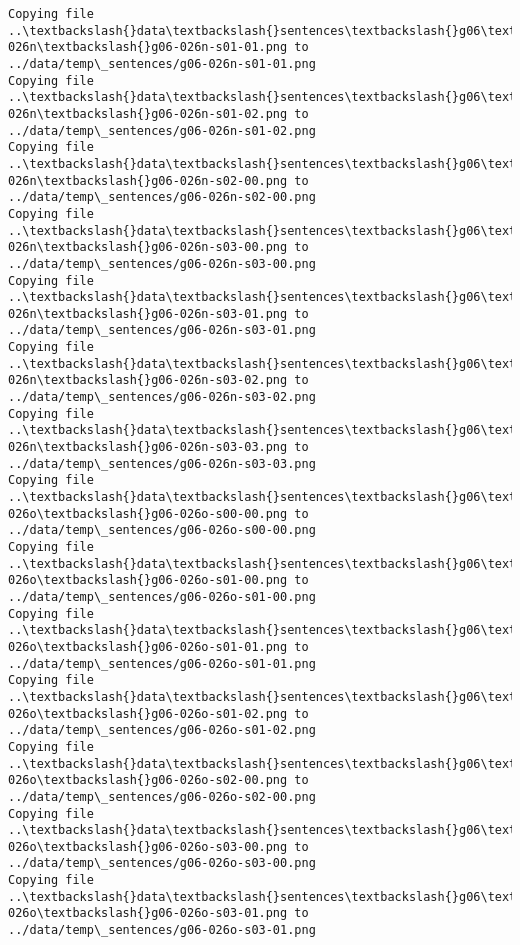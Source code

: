 \documentclass[11pt]{article}
\begin{document}
\begin{Verbatim}[commandchars=\\\{\}]
Copying file ..\textbackslash{}data\textbackslash{}sentences\textbackslash{}g06\textbackslash{}g06-026n\textbackslash{}g06-026n-s01-01.png to
../data/temp\_sentences/g06-026n-s01-01.png
Copying file ..\textbackslash{}data\textbackslash{}sentences\textbackslash{}g06\textbackslash{}g06-026n\textbackslash{}g06-026n-s01-02.png to
../data/temp\_sentences/g06-026n-s01-02.png
Copying file ..\textbackslash{}data\textbackslash{}sentences\textbackslash{}g06\textbackslash{}g06-026n\textbackslash{}g06-026n-s02-00.png to
../data/temp\_sentences/g06-026n-s02-00.png
Copying file ..\textbackslash{}data\textbackslash{}sentences\textbackslash{}g06\textbackslash{}g06-026n\textbackslash{}g06-026n-s03-00.png to
../data/temp\_sentences/g06-026n-s03-00.png
Copying file ..\textbackslash{}data\textbackslash{}sentences\textbackslash{}g06\textbackslash{}g06-026n\textbackslash{}g06-026n-s03-01.png to
../data/temp\_sentences/g06-026n-s03-01.png
Copying file ..\textbackslash{}data\textbackslash{}sentences\textbackslash{}g06\textbackslash{}g06-026n\textbackslash{}g06-026n-s03-02.png to
../data/temp\_sentences/g06-026n-s03-02.png
Copying file ..\textbackslash{}data\textbackslash{}sentences\textbackslash{}g06\textbackslash{}g06-026n\textbackslash{}g06-026n-s03-03.png to
../data/temp\_sentences/g06-026n-s03-03.png
Copying file ..\textbackslash{}data\textbackslash{}sentences\textbackslash{}g06\textbackslash{}g06-026o\textbackslash{}g06-026o-s00-00.png to
../data/temp\_sentences/g06-026o-s00-00.png
Copying file ..\textbackslash{}data\textbackslash{}sentences\textbackslash{}g06\textbackslash{}g06-026o\textbackslash{}g06-026o-s01-00.png to
../data/temp\_sentences/g06-026o-s01-00.png
Copying file ..\textbackslash{}data\textbackslash{}sentences\textbackslash{}g06\textbackslash{}g06-026o\textbackslash{}g06-026o-s01-01.png to
../data/temp\_sentences/g06-026o-s01-01.png
Copying file ..\textbackslash{}data\textbackslash{}sentences\textbackslash{}g06\textbackslash{}g06-026o\textbackslash{}g06-026o-s01-02.png to
../data/temp\_sentences/g06-026o-s01-02.png
Copying file ..\textbackslash{}data\textbackslash{}sentences\textbackslash{}g06\textbackslash{}g06-026o\textbackslash{}g06-026o-s02-00.png to
../data/temp\_sentences/g06-026o-s02-00.png
Copying file ..\textbackslash{}data\textbackslash{}sentences\textbackslash{}g06\textbackslash{}g06-026o\textbackslash{}g06-026o-s03-00.png to
../data/temp\_sentences/g06-026o-s03-00.png
Copying file ..\textbackslash{}data\textbackslash{}sentences\textbackslash{}g06\textbackslash{}g06-026o\textbackslash{}g06-026o-s03-01.png to
../data/temp\_sentences/g06-026o-s03-01.png

\end{Verbatim}
\end{document}
